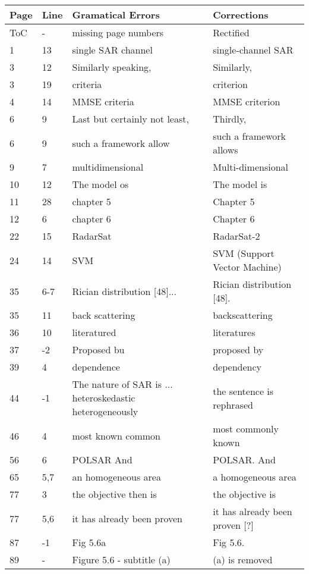 \noindent
\begin{longtable}[c]{p{}|p{}|p{}|p{}}
\textbf{Page} & \textbf{Line} & \textbf{Gramatical Errors} & \textbf{Corrections} \\
 \hline
 \endhead
ToC & - & missing page numbers & Rectified \\
1 & 13 & single SAR channel & single-channel SAR \\ 
3 & 12 & Similarly speaking, & Similarly, \\
3 & 19 & criteria & criterion \\ 
4 & 14 & MMSE criteria & MMSE criterion \\
6 & 9 & Last but certainly not least, & Thirdly, \\ 
6 & 9 & such a framework allow & such a framework allows \\
9 & 7 & multidimensional & Multi-dimensional \\
10 & 12 & The model os & The model is \\
11 & 28 & chapter 5 & Chapter 5 \\
12 & 6 & chapter 6 & Chapter 6 \\
22 & 15 & RadarSat & RadarSat-2 \\
24 & 14 & SVM & SVM (Support Vector Machine) \\
35 & 6-7 & Rician distribution [48]... & Rician distribution [48]. \\
35 & 11 & back scattering & backscattering \\
36 & 10 & literatured & literatures \\
37 & -2 & Proposed bu & proposed by \\
39 & 4 & dependence & dependency \\
44 & -1 & The nature of SAR is ... heteroskedastic heterogeneously & the sentence is rephrased \\
46 & 4 & most known common & most commonly known \\
56 & 6 & POLSAR And & POLSAR. And \\
65 &5,7 & an homogeneous area & a homogeneous area \\
77 & 3 & the objective then is & the objective is \\
77 & 5,6 & it has already been proven & it has already been proven [?] \\
87 & -1 & Fig 5.6a & Fig 5.6. \\
89 & - & Figure 5.6 - subtitle (a) & (a) is removed \\

\end{longtable}
